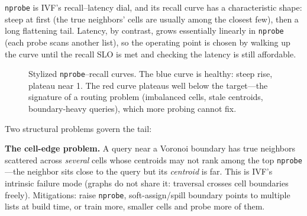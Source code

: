 \texttt{nprobe} is IVF's recall--latency dial, and its recall curve has a characteristic shape: steep at first (the true neighbors' cells are usually among the closest few), then a long flattening tail. Latency, by contrast, grows essentially linearly in \texttt{nprobe} (each probe scans another list), so the operating point is chosen by walking up the curve until the recall SLO is met and checking the latency is still affordable.

\begin{figure}[H]
\centering
{}
\caption{Stylized \texttt{nprobe}--recall curves. The blue curve is healthy: steep rise, plateau near 1. The red curve plateaus well below the target---the signature of a routing problem (imbalanced cells, stale centroids, boundary-heavy queries), which more probing cannot fix.}
\label{sr:fig:nprobe_recall}
\end{figure}

Two structural problems govern the tail:

\textbf{The cell-edge problem.} A query near a Voronoi boundary has true neighbors scattered across \emph{several} cells whose centroids may not rank among the top \texttt{nprobe}---the neighbor sits close to the query but its \emph{centroid} is far. This is IVF's intrinsic failure mode (graphs do not share it: traversal crosses cell boundaries freely). Mitigations: raise \texttt{nprobe}, soft-assign/spill boundary points to multiple lists at build time, or train more, smaller cells and probe more of them.

